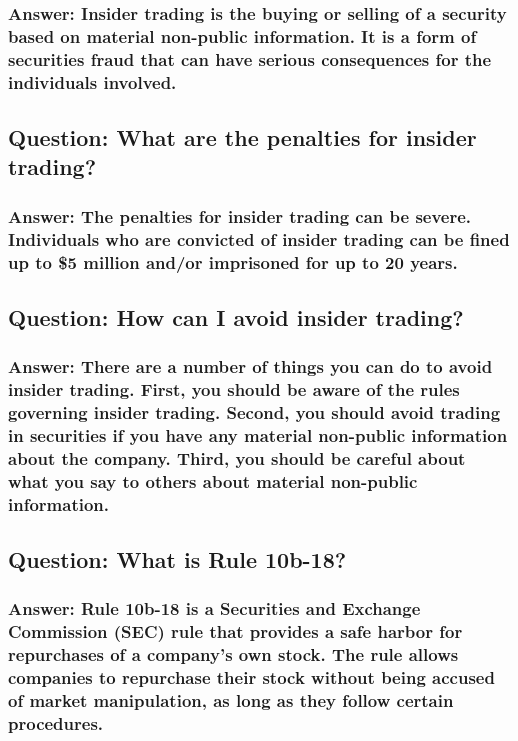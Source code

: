 \documentclass[11pt]{article}
\begin{document}
\subsubsection{Answer: Insider trading is the buying or selling of a security based on material non-public information. It is a form of securities fraud that can have serious consequences for the individuals involved.}
\label{sec:org555e21e}

\subsection{Question: What are the penalties for insider trading?}
\label{sec:org6e747fc}

\subsubsection{Answer: The penalties for insider trading can be severe. Individuals who are convicted of insider trading can be fined up to \$5 million and/or imprisoned for up to 20 years.}
\label{sec:org9b482be}

\subsection{Question: How can I avoid insider trading?}
\label{sec:orgf692646}

\subsubsection{Answer: There are a number of things you can do to avoid insider trading. First, you should be aware of the rules governing insider trading. Second, you should avoid trading in securities if you have any material non-public information about the company. Third, you should be careful about what you say to others about material non-public information.}
\label{sec:org2267c15}





\subsection{Question: What is Rule 10b-18?}
\label{sec:org78dfefc}

\subsubsection{Answer: Rule 10b-18 is a Securities and Exchange Commission (SEC) rule that provides a safe harbor for repurchases of a company's own stock. The rule allows companies to repurchase their stock without being accused of market manipulation, as long as they follow certain procedures.}
\label{sec:orgdc5d722}
\end{document}
